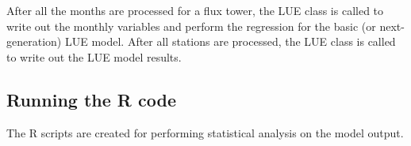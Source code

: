 After all the months are processed for a flux tower, the LUE class is called to write out the monthly variables and perform the regression for the basic (or next-generation) LUE model. 
After all stations are processed, the LUE class is called to write out the LUE model results.

\subsection{Running the R code}
\label{sec:modelr}
The R scripts are created for performing statistical analysis on the model output.

